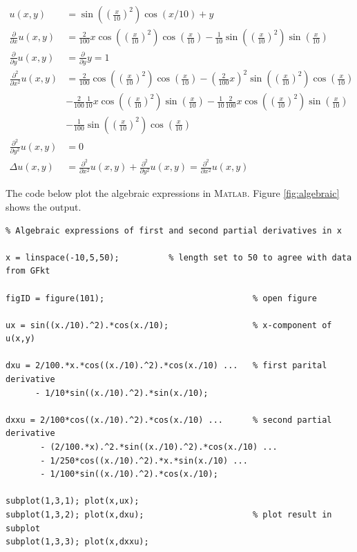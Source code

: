 \documentclass[paper=a4, fontsize=12pt]{article} %
\begin{document}
\begin{align*}
u(x,y) &= \sin\left(\left(\frac{x}{10}\right) ^2\right ) \cos(x/10)+y \\
\frac{\partial}{\partial x} u(x,y) &= \frac{2}{100}x\cos\left(\left(\frac{x}{10}\right) ^2\right )\cos\left(\frac{x}{10}\right )- \frac{1}{10}\sin\left(\left(\frac{x}{10}\right) ^2\right )\sin\left (\frac{x}{10}\right )\\
\frac{\partial}{\partial y} u(x,y) &= \frac{\partial}{\partial y}y = 1   \\
\frac{\partial^2}{\partial x^2} u(x,y) &= \frac{2}{100}\cos\left(\left(\frac{x}{10}\right) ^2\right )\cos\left(\frac{x}{10}\right ) - \left ( \frac{2}{100}x\right )^2 \sin \left(\left(\frac{x}{10}\right) ^2\right )\cos\left(\frac{x}{10}\right ) \\
 &- \frac{2}{100}\frac{1}{10}x\cos\left(\left(\frac{x}{10}\right) ^2\right )\sin\left(\frac{x}{10}\right ) - \frac{1}{10}\frac{2}{100}x \cos\left(\left(\frac{x}{10}\right) ^2\right )\sin\left (\frac{x}{10}\right )\\
 & - \frac{1}{100}\sin\left(\left(\frac{x}{10}\right) ^2\right )\cos\left (\frac{x}{10}\right )\\
\frac{\partial^2}{\partial y^2} u(x,y) &= 0 \\
\Delta u(x,y) &= \frac{\partial^2}{\partial x^2} u(x,y) + \frac{\partial^2}{\partial y^2} u(x,y) =  \frac{\partial^2}{\partial x^2} u(x,y)
\end{align*}


The code below plot the algebraic expressions in \textsc{Matlab}. Figure \ref{fig:algebraic} shows the output.

\begin{lstlisting}
% Algebraic expressions of first and second partial derivatives in x

x = linspace(-10,5,50);		     % length set to 50 to agree with data from GFkt

figID = figure(101);                              % open figure

ux = sin((x./10).^2).*cos(x./10);                 % x-component of u(x,y)

dxu = 2/100.*x.*cos((x./10).^2).*cos(x./10) ...   % first parital derivative
      - 1/10*sin((x./10).^2).*sin(x./10);

dxxu = 2/100*cos((x./10).^2).*cos(x./10) ...      % second partial derivative
       - (2/100.*x).^2.*sin((x./10).^2).*cos(x./10) ...
       - 1/250*cos((x./10).^2).*x.*sin(x./10) ...
       - 1/100*sin((x./10).^2).*cos(x./10);
       
subplot(1,3,1); plot(x,ux);
subplot(1,3,2); plot(x,dxu);                      % plot result in subplot
subplot(1,3,3); plot(x,dxxu);

\end{lstlisting}
\end{document}
